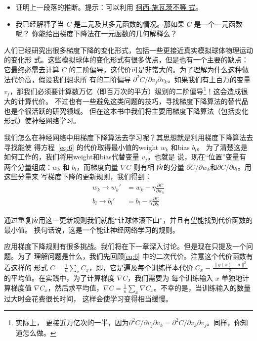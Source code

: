 \begin{itemize}
\item 证明上一段落的推断。提示：可以利用%
  \href{http://en.wikipedia.org/wiki/Cauchy–Schwarz_inequality}{柯西-施瓦茨不等
    式}。
\item 我已经解释了当 $C$ 是二元及其多元函数的情况。那如果 $C$ 是一个一元函数呢？
  你能给出梯度下降法在一元函数的几何解释么？
\end{itemize}

人们已经研究出很多梯度下降的变化形式，包括一些更接近真实模拟球体物理运动的变化形
式。这些模拟球体的变化形式有很多优点，但是也有一个主要的缺点：它最终必需去计算
$C$ 的二阶偏导，这代价可是非常大的。为了理解为什么这种做法代价高，假设我们想求所
有的二阶偏导 $\partial^2 C/ \partial v_j \partial v_k$。如果我们有上百万的变量
$v_j$，那我们必须要计算数万亿（即百万次的平方）级别的二阶偏导\footnote{实际上，
  更接近万亿次的一半，因为$\partial^2 C/ \partial v_j \partial v_k = \partial^2
  C/ \partial v_k \partial v_j$。同样，你知道怎么做。}！这会造成很大的计算代价。
不过也有一些避免这类问题的技巧，寻找梯度下降算法的替代品也是个很活跃的研究领域。
但在这本书中我们将主要用梯度下降算法（包括变化形式）使神经网络学习。

我们怎么在神经网络中用梯度下降算法去学习呢？其思想就是利用梯度下降算法去寻找能使
得方程~\eqref{eq:6} 的代价取得最小值的\gls*{weight} $w_k$ 和\gls*{bias} $b_l$。
为了清楚这是如何工作的，我们将用\gls*{weight}和\gls*{bias}代替变量 $v_j$。也就是
说，现在“位置”变量有两个分量组成：$w_k$ 和 $b_l$，而梯度向量 $\nabla C$ 则有相
应的分量 $\partial C / \partial w_k$和$\partial C / \partial b_l$。用这些分量来
写梯度下降的更新规则，我们得到：
\begin{align}
  \label{eq:16}w_k \rightarrow w_k' &= w_k-\eta \frac{\partial C}{\partial w_k}\tag{16}\\
  \label{eq:17}b_l \rightarrow b_l' &= b_l-\eta \frac{\partial C}{\partial b_l}\tag{17}
\end{align}

通过重复应用这一更新规则我们就能“让球体滚下山”，并且有望能找到代价函数的最小值。
换句话说，这是一个能让神经网络学习的规则。

应用梯度下降规则有很多挑战。我们将在下一章深入讨论。但是现在只提及一个问题。为了
理解问题是什么，我们先回顾\eqref{eq:6} 中的二次代价。注意这个代价函数有着这样的
形式 $C = \frac{1}{n} \sum_x C_x$，即，它是遍及每个训练样本代价 $C_x \equiv
\frac{\|y(x)-a\|^2}{2}$ 的平均值。在实践中，为了计算梯度 $\nabla C$，我们需要为
每个训练输入 $x$ 单独地计算梯度值 $\nabla C_x$，然后求平均值，$\nabla C =
\frac{1}{n} \sum_x \nabla C_x$。不幸的是，当训练输入的数量过大时会花费很长时间，
这样会使学习变得相当缓慢。

